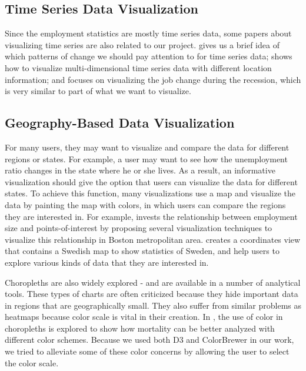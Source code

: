 \documentclass{sigchi}
\begin{document}
\subsection{Time Series Data Visualization}

Since the employment statistics are mostly time series data, some papers \cite{few_visualizing_2007,peng_method_2008,ashkenas_how_2014} about visualizing time series are also related to our project. \cite{few_visualizing_2007}  gives us a brief idea of which patterns of change we should pay attention to for time series data; \cite{peng_method_2008} shows how to visualize multi-dimensional time series data with different location information; and \cite{ashkenas_how_2014} focuses on visualizing the job change during the recession, which is very similar to part of what we want to visualize.


\subsection{Geography-Based Data Visualization}

For many users, they may want to visualize and compare the data for different regions or states. For example, a user may want to see how the unemployment ratio changes in the state where he or she lives. As a result, an informative visualization should give the option that users can visualize the data for different states. To achieve this function, many visualizations use a map and visualize the data by painting the map with colors, in which users can compare the regions they are interested in. For example, \cite{rodrigues_estimating_2013} invests the relationship between employment size and points-of-interest by proposing several visualization techniques to visualize this relationship in Boston metropolitan area. \cite{feldt_tailor-made_2005} creates a coordinates view that contains a Swedish map to show statistics of Sweden, and help users to explore various kinds of data that they are interested in.

Choropleths are also widely explored - and are available in a number of analytical tools. These types of charts are often criticized because they hide important data in regions that are geographically small. They also suffer from similar problems as heatmaps because color scale is vital in their creation. In \cite{brewer_mapping_1997}, the use of color in choropleths is explored to show how mortality can be better analyzed with different color schemes. Because we used both D3 \cite{bostock_d3_2011} and ColorBrewer in our work, we tried to alleviate some of these color concerns by allowing the user to select the color scale.
\end{document}
